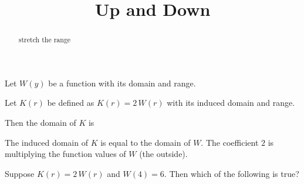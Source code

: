 \documentclass{ximera}
\title{Up and Down}
\begin{document}
\begin{abstract}
stretch the range
\end{abstract}
\maketitle











Let $W(y)$ be a function with its domain and range.

Let $K(r)$ be defined as $K(r) = 2 \, W(r)$ with its induced domain and range.


Then the domain of $K$ is

\begin{multipleChoice}
\end{multipleChoice}

The induced domain of $K$ is equal to the domain of $W$.  The coefficient $2$ is multiplying the function values of $W$ (the outside).



\begin{question}


Suppose $K(r) = 2 \, W(r)$ and $W(4) = 6$.  Then which of the following is true?

\begin{multipleChoice}
\end{multipleChoice}


\end{question}
\end{document}
